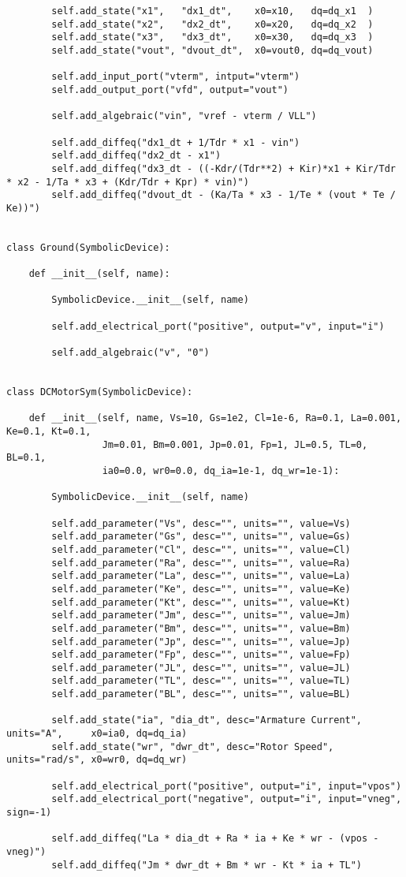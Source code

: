 \begin{lstlisting}
        self.add_state("x1",   "dx1_dt",    x0=x10,   dq=dq_x1  )
        self.add_state("x2",   "dx2_dt",    x0=x20,   dq=dq_x2  )
        self.add_state("x3",   "dx3_dt",    x0=x30,   dq=dq_x3  )
        self.add_state("vout", "dvout_dt",  x0=vout0, dq=dq_vout)

        self.add_input_port("vterm", intput="vterm")
        self.add_output_port("vfd", output="vout")

        self.add_algebraic("vin", "vref - vterm / VLL")

        self.add_diffeq("dx1_dt + 1/Tdr * x1 - vin")
        self.add_diffeq("dx2_dt - x1")
        self.add_diffeq("dx3_dt - ((-Kdr/(Tdr**2) + Kir)*x1 + Kir/Tdr * x2 - 1/Ta * x3 + (Kdr/Tdr + Kpr) * vin)")
        self.add_diffeq("dvout_dt - (Ka/Ta * x3 - 1/Te * (vout * Te / Ke))")


class Ground(SymbolicDevice):

    def __init__(self, name):

        SymbolicDevice.__init__(self, name)

        self.add_electrical_port("positive", output="v", input="i")

        self.add_algebraic("v", "0")


class DCMotorSym(SymbolicDevice):

    def __init__(self, name, Vs=10, Gs=1e2, Cl=1e-6, Ra=0.1, La=0.001, Ke=0.1, Kt=0.1,
                 Jm=0.01, Bm=0.001, Jp=0.01, Fp=1, JL=0.5, TL=0, BL=0.1,
                 ia0=0.0, wr0=0.0, dq_ia=1e-1, dq_wr=1e-1):

        SymbolicDevice.__init__(self, name)

        self.add_parameter("Vs", desc="", units="", value=Vs)
        self.add_parameter("Gs", desc="", units="", value=Gs)
        self.add_parameter("Cl", desc="", units="", value=Cl)
        self.add_parameter("Ra", desc="", units="", value=Ra)
        self.add_parameter("La", desc="", units="", value=La)
        self.add_parameter("Ke", desc="", units="", value=Ke)
        self.add_parameter("Kt", desc="", units="", value=Kt)
        self.add_parameter("Jm", desc="", units="", value=Jm)
        self.add_parameter("Bm", desc="", units="", value=Bm)
        self.add_parameter("Jp", desc="", units="", value=Jp)
        self.add_parameter("Fp", desc="", units="", value=Fp)
        self.add_parameter("JL", desc="", units="", value=JL)
        self.add_parameter("TL", desc="", units="", value=TL)
        self.add_parameter("BL", desc="", units="", value=BL)

        self.add_state("ia", "dia_dt", desc="Armature Current", units="A",     x0=ia0, dq=dq_ia)
        self.add_state("wr", "dwr_dt", desc="Rotor Speed",      units="rad/s", x0=wr0, dq=dq_wr)

        self.add_electrical_port("positive", output="i", input="vpos")
        self.add_electrical_port("negative", output="i", input="vneg", sign=-1)

        self.add_diffeq("La * dia_dt + Ra * ia + Ke * wr - (vpos - vneg)")
        self.add_diffeq("Jm * dwr_dt + Bm * wr - Kt * ia + TL")
\end{lstlisting}